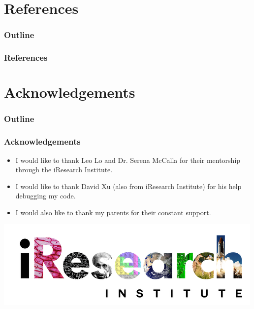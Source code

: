 \documentclass[12pt]{beamer}
\begin{document}
\section{References}
\begin{frame}
\frametitle{Outline}
\tableofcontents[currentsection]
\end{frame}

\begin{frame}
\frametitle{References}
\end{frame}


\section{Acknowledgements}
\begin{frame}
\frametitle{Outline}
\tableofcontents[currentsection]
\end{frame}

\begin{frame}
\frametitle{Acknowledgements}
\begin{itemize}
    \item I would like to thank Leo Lo and Dr. Serena McCalla for their mentorship through the iResearch Institute.
    \item I would like to thank David Xu (also from iResearch Institute) for his help debugging my code.
    \item I would also like to thank my parents for their constant support.
\end{itemize}



\begin{center}
\includegraphics[scale = 0.58]{iresearch.png}
\end{center}


\end{frame}
\end{document}
